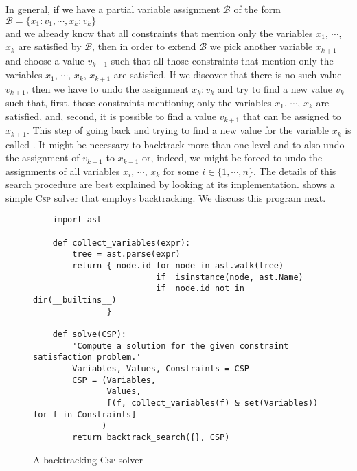 In general, if we have a partial variable assignment $\mathcal{B}$ of the form
\\[0.2cm]
\hspace*{1.3cm}
$\mathcal{B} = \{ x_1:v_1, \cdots, x_k:v_k \}$
\\[0.2cm]
and we already know that all constraints that mention only the variables $x_1$, $\cdots$, $x_k$ are satisfied
by $\mathcal{B}$, then in order to extend $\mathcal{B}$ we pick another variable $x_{k+1}$ and choose a
value $v_{k+1}$ such that all those constraints that mention only the variables  $x_1$, $\cdots$, $x_k$,
$x_{k+1}$ are satisfied.  If we discover that there is no such value $v_{k+1}$, then we have to undo the
assignment $x_k:v_k$ and try to find a new value $v_k$ such that, first, those constraints mentioning only 
the variables  $x_1$, $\cdots$, $x_k$ are satisfied, and, second, it is possible to find a value $v_{k+1}$ that
can be assigned to $x_{k+1}$.  This step of going back and trying to find a new value for the variable $x_k$ is
called .  It might be necessary to backtrack more than one level and to also undo the
assignment of $v_{k-1}$ to $x_{k-1}$ or, indeed, we might be forced to undo the assignments of all variables
$x_i$, $\cdots$, $x_k$ for some $i \in \{1,\cdots, n\}$.  The details of this search procedure are best
explained by looking at its implementation.  shows a simple \textsc{Csp} solver that
employs backtracking.  We discuss this program next.

\begin{figure}[!ht]
\centering
\begin{verbatim}
    import ast
                  
    def collect_variables(expr): 
        tree = ast.parse(expr)
        return { node.id for node in ast.walk(tree) 
                         if  isinstance(node, ast.Name) 
                         if  node.id not in dir(__builtins__)
               }
                  
    def solve(CSP):
        'Compute a solution for the given constraint satisfaction problem.'
        Variables, Values, Constraints = CSP
        CSP = (Variables,
               Values,
               [(f, collect_variables(f) & set(Variables)) for f in Constraints]
              )
        return backtrack_search({}, CSP)
\end{verbatim}
\vspace*{-0.3cm}
\caption{A backtracking \textsc{Csp} solver}
\label{fig:CSP-Solver.ipynb}
\end{figure}

